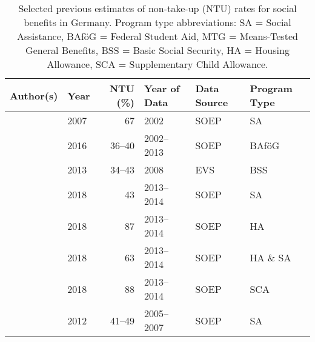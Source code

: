 \begin{table}[htbp]
\centering
\begin{tabular}{llrlll}
\toprule
\textbf{Author(s)} & \textbf{Year} & \textbf{NTU (\%)} & \textbf{Year of Data} & \textbf{Data Source} & \textbf{Program Type} \\
\midrule
\citeauthor{frick_claim_2007}              & 2007          & 67             & 2002                  & SOEP             & SA               \\
\citeauthor{herber_non-take-up_2019}       & 2016          & 36--40         & 2002--2013            & SOEP             & BAföG            \\
\citeauthor{RePEc:iab:iabfob:201305}       & 2013          & 34--43         & 2008                  & EVS              & BSS              \\
\citeauthor{bruckmeier_benefit_2018}       & 2018          & 43             & 2013--2014            & SOEP             & SA               \\
\citeauthor{bruckmeier_benefit_2018}       & 2018          & 87             & 2013--2014            & SOEP             & HA               \\
\citeauthor{bruckmeier_benefit_2018}       & 2018          & 63             & 2013--2014            & SOEP             & HA \& SA         \\
\citeauthor{bruckmeier_benefit_2018}       & 2018          & 88             & 2013--2014            & SOEP             & SCA              \\
\citeauthor{bruckmeier_new_2012}           & 2012          & 41--49         & 2005--2007            & SOEP             & SA               \\
\bottomrule
\end{tabular}
\caption{Selected previous estimates of non-take-up (NTU) rates for social benefits in Germany. Program type abbreviations: SA = Social Assistance, BAföG = Federal Student Aid, MTG = Means-Tested General Benefits, BSS = Basic Social Security, HA = Housing Allowance, SCA = Supplementary Child Allowance.}
\label{table:NTU-studies}
\end{table}
